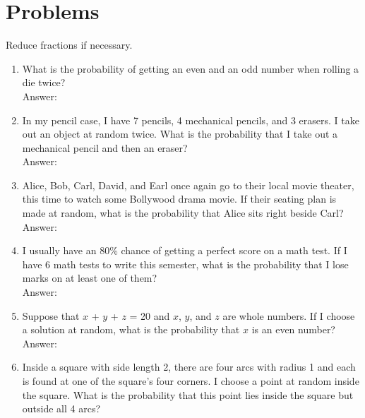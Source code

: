 \documentclass[12pt]{extarticle}
\begin{document}
\section{Problems}
{Reduce fractions if necessary.}
\begin{enumerate}
    \itemsep 2.0em
    \item {What is the probability of getting an even and an odd number when rolling a die twice? \\Answer: }
    \item {In my pencil case, I have 7 pencils, 4 mechanical pencils, and 3 erasers. I take out an object at random twice. What is the probability that I take out a mechanical pencil and then an eraser? \\Answer: }
    \item {Alice, Bob, Carl, David, and Earl once again go to their local movie theater, this time to watch some Bollywood drama movie. If their seating plan is made at random, what is the probability that Alice sits right beside Carl? \\Answer: }
    \item {I usually have an 80\% chance of getting a perfect score on a math test. If I have 6 math tests to write this semester, what is the probability that I lose marks on at least one of them? \\Answer: }
    \item {Suppose that $x$ + $y$ + $z$ = 20 and $x$, $y$, and $z$ are whole numbers. If I choose a solution at random, what is the probability that $x$ is an even number? \\Answer: }
    \item {Inside a square with side length 2, there are four arcs with radius 1 and each is found at one of the square's four corners. I choose a point at random inside the square. What is the probability that this point lies inside the square but outside all 4 arcs?\\\\
}
\end{enumerate}
\end{document}
